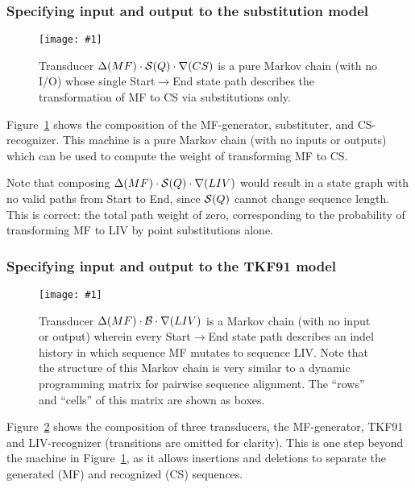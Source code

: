 \documentclass{article}
\newcommand{\figref}[1]{Figure~\ref{Figures.#1}}
\newcommand{\figlabel}[1]{\label{Figures.#1}}
\newcommand{\easyfig}[4]{
\begin{figure}
\texttt{[image: \#1]}
\caption{ \figlabel{#3} #4}
\end{figure}}
\newcommand{\pdffig}[2]{\easyfig{#1-fig.pdf}{}{#1}{#2}}
\newcommand{\widepdffig}[2]{\easyfig{#1-fig.pdf}{width=\textwidth}{#1}{#2}}
\newcommand\substitute{{\cal S}}
\newcommand\tkf{{\cal B}}
\newcommand\generate{\Delta}
\newcommand\recognize{\nabla}
\begin{document}
\subsubsection{Specifying input and output to the substitution model}


\pdffig{mf-substituter-cs}{Transducer $\generate(MF) \cdot \substitute(Q) \cdot \recognize(CS)$ is a pure Markov chain (with no I/O) whose single Start$\to$End state path describes the transformation of MF to CS via substitutions only. }

\figref{mf-substituter-cs} shows the composition of the MF-generator, substituter, and CS-recognizer.  
This machine is a pure Markov chain (with no inputs or outputs) which can be used to compute 
the weight of transforming MF to CS.  

Note that composing $\generate(MF) \cdot \substitute(Q) \cdot \recognize(LIV) $
would result in a state graph with no valid paths from Start to End, since $\substitute(Q)$ cannot change sequence length.  
This is correct: the total path weight of zero, corresponding to the probability of transforming MF to LIV by point substitutions alone.  


\subsubsection{Specifying input and output to the TKF91 model}

\widepdffig{mf-tkf91-liv}{Transducer $\generate(MF) \cdot \tkf \cdot \recognize(LIV)$ is a Markov chain (with no input or output) wherein every Start$\to$End state path describes an indel history
in which sequence MF mutates to sequence LIV. Note that the structure of this Markov chain is very similar to a dynamic programming matrix for pairwise sequence alignment. The ``rows'' and ``cells'' of this matrix are shown as boxes.}

\figref{mf-tkf91-liv} shows the composition of three transducers, the MF-generator, TKF91 and LIV-recognizer
(transitions are omitted for clarity).
This is one step beyond the machine in \figref{mf-substituter-cs}, as it allows 
insertions and deletions to separate the generated (MF) and recognized (CS) sequences.  
\end{document}
